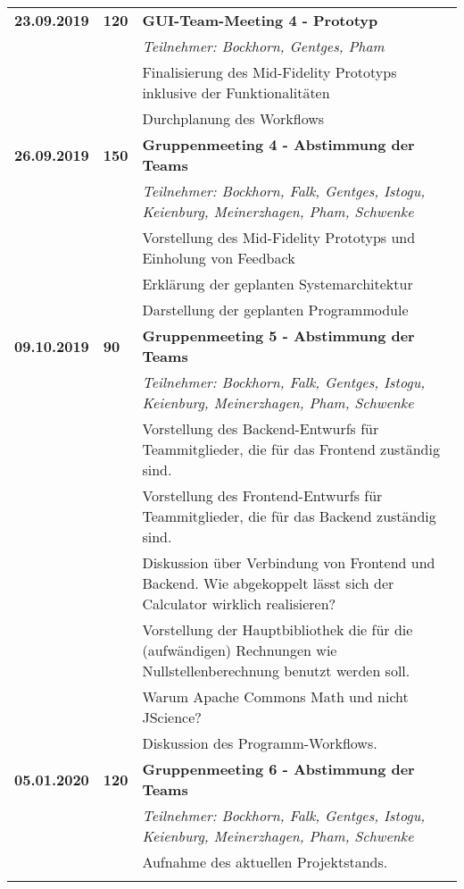 {{\begin{longtable}{|l|l|p{11cm}|}
	\\\hline
		\textbf{23.09.2019} 
			& \textbf{\hfill120} & \textbf{GUI-Team-Meeting 4 - Prototyp} 
			\\ & &
			\small{\textit{Teilnehmer: Bockhorn, Gentges, Pham}}
			\\ & &
			Finalisierung des Mid-Fidelity Prototyps inklusive der Funktionalitäten
			\\ & &
			Durchplanung des Workflows			
	\\\hline
		\textbf{26.09.2019} 
			& \textbf{\hfill150} & \textbf{Gruppenmeeting 4 - Abstimmung der Teams}
			\\ & &
			\small{\textit{Teilnehmer: Bockhorn, Falk, Gentges, Istogu, Keienburg, Meinerzhagen, Pham, Schwenke}}
			\\ & &
			Vorstellung des Mid-Fidelity Prototyps und Einholung von Feedback
			\\ & &
			Erklärung der geplanten Systemarchitektur
			\\ & &
			Darstellung der geplanten Programmodule			
	\\\hline
		\textbf{09.10.2019} 
			& \textbf{\hfill90} & \textbf{Gruppenmeeting 5 - Abstimmung der Teams}
			\\ & &
			\small{\textit{Teilnehmer: Bockhorn, Falk, Gentges, Istogu, Keienburg, Meinerzhagen, Pham, Schwenke}}
			\\ & &
			Vorstellung des Backend-Entwurfs für Teammitglieder, die für das Frontend zuständig sind.
			\\ & &
			Vorstellung des Frontend-Entwurfs für Teammitglieder, die für das Backend zuständig sind.
			\\ & &
			Diskussion über Verbindung von Frontend und Backend. Wie abgekoppelt lässt sich der Calculator wirklich realisieren?
			\\ & &
			Vorstellung der Hauptbibliothek die für die (aufwändigen) Rechnungen wie Nullstellenberechnung benutzt werden soll.
			\\ & &
			Warum Apache Commons Math und nicht JScience?
			\\ & &
			Diskussion des Programm-Workflows.
	\\ \hline
		\textbf{05.01.2020} 
			& \textbf{\hfill120} & \textbf{Gruppenmeeting 6 - Abstimmung der Teams}
			\\ & &
			\small{\textit{Teilnehmer: Bockhorn, Falk, Gentges, Istogu, Keienburg, Meinerzhagen, Pham, Schwenke}}
			\\ & &
			Aufnahme des aktuellen Projektstands.
			\\ & &

\end{longtable}}}
